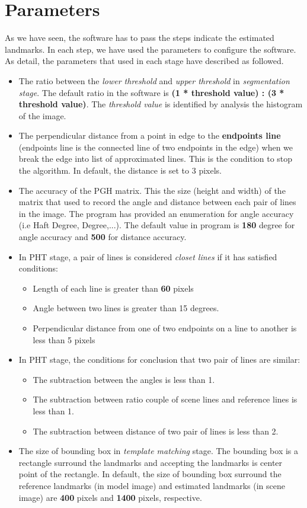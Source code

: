 \section{Parameters}
As we have seen, the software has to pass the steps indicate the estimated landmarks. In each step, we have used the parameters to configure the software. As detail, the parameters that used in each stage have described as followed.
\begin{itemize}
	\item The ratio between the \textit{lower threshold} and \textit{upper threshold} in \textit{segmentation stage}. The default ratio in the software is \textbf{(1 * threshold value) : (3 * threshold value)}. The \textit{threshold value} is identified by analysis the histogram of the image.
	\item The perpendicular distance from a point in edge to the \textbf{endpoints line} (endpoints line is the connected line of two endpoints in the edge) when we break the edge into list of approximated lines. This is the condition to stop the algorithm. In default, the distance is set to 3 pixels.
	\item The accuracy of the PGH matrix. This the size (height and width) of the matrix that used to record the angle and distance between each pair of lines in the image. The program has provided an enumeration for angle accuracy (i.e Haft Degree, Degree,...). The default value in program is \textbf{180} degree for angle accuracy and \textbf{500} for distance accuracy.
	\item In PHT stage, a pair of lines is considered \textit{closet lines} if it has satisfied conditions:
		\begin{itemize}
			\item Length of each line is greater than \textbf{60} pixels
			\item Angle between two lines is greater than 15 degrees.
			\item Perpendicular distance from one of two endpoints on a line to another is less than 5 pixels
		\end{itemize}
	\item In PHT stage, the conditions for conclusion that two pair of lines are similar:
		\begin{itemize}
			\item The subtraction between the angles is less than 1.
			\item The subtraction between ratio couple of scene lines and reference lines is less than 1.
			\item The subtraction between distance of two pair of lines is less than 2.
		\end{itemize}
	\item The size of bounding box in \textit{template matching} stage. The bounding box is a rectangle surround the landmarks and accepting the landmarks is  center point of the rectangle. In default, the size of bounding box surround the reference landmarks (in model image) and estimated landmarks (in scene image) are \textbf{400} pixels and \textbf{1400} pixels, respective.
\end{itemize}